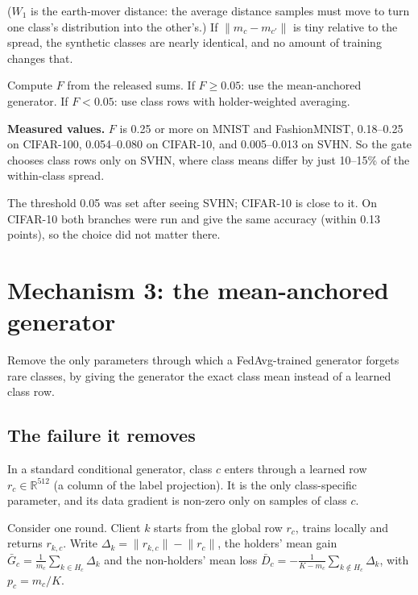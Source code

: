 \documentclass[11pt]{article}
\theoremstyle{plain}
\theoremstyle{definition}
\newcommand{\R}{\mathbb{R}}
\newcommand{\norm}[1]{\lVert #1\rVert}
\begin{document}
($W_1$ is the earth-mover distance: the average distance samples must move to turn one class's distribution into
the other's.) If $\norm{m_c-m_{c'}}$ is tiny relative to the spread, the synthetic classes are nearly identical, and no
amount of training changes that.

\begin{steps}
Compute $F$ from the released sums. If $F\ge0.05$: use the mean-anchored generator. If $F<0.05$: use class rows with
holder-weighted averaging.
\end{steps}

\textbf{Measured values.} $F$ is 0.25 or more on MNIST and FashionMNIST, 0.18--0.25 on CIFAR-100, 0.054--0.080 on
CIFAR-10, and 0.005--0.013 on SVHN. So the gate chooses class rows only on SVHN, where class means differ by just
10--15\% of the within-class spread.

\begin{caveat}
The threshold 0.05 was set after seeing SVHN; CIFAR-10 is close to it. On CIFAR-10 both branches were run and give
the same accuracy (within 0.13 points), so the choice did not matter there.
\end{caveat}

\section{Mechanism 3: the mean-anchored generator}\label{sec:anchor}

\begin{purpose}
Remove the only parameters through which a FedAvg-trained generator forgets rare classes, by giving the generator the
exact class mean instead of a learned class row.
\end{purpose}

\subsection{The failure it removes}

In a standard conditional generator, class $c$ enters through a learned row $r_c\in\R^{512}$ (a column of the label
projection). It is the only class-specific parameter, and its data gradient is non-zero only on samples of class $c$.

Consider one round. Client $k$ starts from the global row $r_c$, trains locally and returns $r_{k,c}$. Write
$\Delta_k=\norm{r_{k,c}}-\norm{r_c}$, the holders' mean gain $\bar G_c=\frac1{m_c}\sum_{k\in H_c}\Delta_k$ and the
non-holders' mean loss $\bar D_c=-\frac1{K-m_c}\sum_{k\notin H_c}\Delta_k$, with $p_c=m_c/K$.
\end{document}
